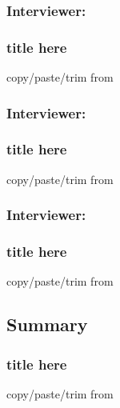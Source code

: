 
\subsubsection{Interviewer: \dd}

\begin{frame}
\frametitle{title here}
copy/paste/trim from 
\end{frame}


\subsubsection{Interviewer: \md}

\begin{frame}
\frametitle{title here}
copy/paste/trim from 
\end{frame}


\subsubsection{Interviewer: \vp}

\begin{frame}
\frametitle{title here}
copy/paste/trim from 
\end{frame}


\subsection{Summary}

\begin{frame}
\frametitle{title here}
copy/paste/trim from 
\end{frame}

